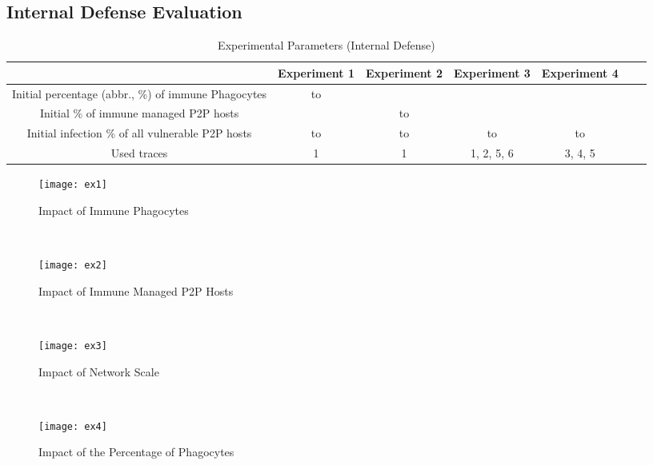 \documentclass[times,10pt,twocolumn]{article}
\begin{document}
\subsection{Internal Defense Evaluation}


\begin{table*}[tbp]
    \centering
    \caption{Experimental Parameters (Internal Defense)}
    \label{tab:ex_in}
    \footnotesize{
    \begin{tabular}{|c|c|c|c|c|c|c|}
        \hline
                                                            & Experiment 1          & Experiment 2          & Experiment 3          & Experiment 4          \\
        \hline
        Initial percentage (abbr., \%) of immune Phagocytes &  to      &                 &                 &                 \\
        \hline
        Initial \% of immune managed P2P hosts              &                 &  to        &                 &                 \\
        \hline
        Initial infection \% of all vulnerable P2P hosts    &  to  &  to  &  to  &  to  \\
        \hline
        Used traces                                         & 1                     & 1                     & 1, 2, 5, 6            & 3, 4, 5               \\
        \hline
    \end{tabular}}
\end{table*}

\begin{figure*}[tbp]
    \centering
    \begin{minipage}[t]{0.243\textwidth}
        \centering
        \texttt{[image: ex1]}
        \caption{Impact of Immune Phagocytes}
        \label{fig:ex1}
    \end{minipage} \
    \begin{minipage}[t]{0.243\textwidth}
        \centering
        \texttt{[image: ex2]}
        \caption{Impact of Immune Managed P2P Hosts}
        \label{fig:ex2}
    \end{minipage} \
    \begin{minipage}[t]{0.243\textwidth}
        \centering
        \texttt{[image: ex3]}
        \caption{Impact of Network Scale}
        \label{fig:ex3}
    \end{minipage} \
    \begin{minipage}[t]{0.243\textwidth}
        \centering
        \texttt{[image: ex4]}
        \caption{Impact of the Percentage of Phagocytes}
        \label{fig:ex4}
    \end{minipage}
\end{figure*}
\end{document}
